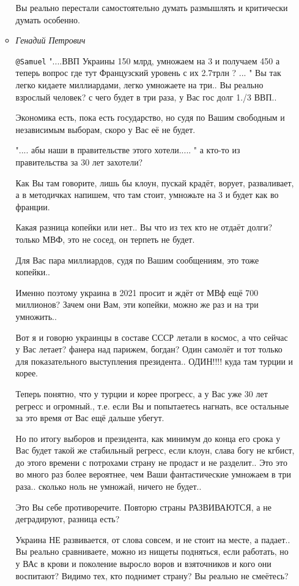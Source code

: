 \begin{itemize}
\begin{itemize}
Вы реально перестали самостоятельно думать размышлять и критически думать
особенно.

\item \emph{Генадий Петрович}

\verb|@Samuel|  "....ВВП Украины 150 млрд, умножаем на 3 и получаем 450 а теперь
вопрос где тут Французский уровень с их 2.7трлн ? ... " Вы так легко кидаете
миллиардами, легко умножаете на три..  Вы реально взрослый человек? с чего
будет в три раза, у Вас гос долг 1./3 ВВП..

Экономика есть, пока есть государство, но судя по Вашим свободным и
независимым выборам, скоро у Вас её не будет.

".... абы наши в правительстве этого хотели..... " а кто-то из правительства
за 30 лет захотели? 

Как Вы там говорите, лишь бы клоун, пускай крадёт, ворует, разваливает, а в
методичках напишем, что там стоит, умножьте на 3 и будет как во франции.

Какая разница копейки или нет.. Вы что из тех кто не отдаёт долги? только МВФ, это не сосед, он терпеть не будет.

Для Вас пара миллиардов, судя по Вашим сообщениям, это тоже копейки..

Именно поэтому украина в 2021 просит и ждёт от МВф ещё 700 миллионов? Зачем они Вам, эти копейки, можно же раз и на три умножить..

Вот я и говорю украинцы в составе СССР летали в космос, а что сейчас у Вас
летает? фанера над парижем, богдан? Один самолёт и тот только для
показательного выступления президента.. ОДИН!!!!  куда там турции и корее.

Теперь понятно, что у турции и корее прогресс, а у Вас уже 30 лет регресс и
огромный., т.е. если Вы и попытаетесь нагнать, все остальные за это время от
Вас ещё дальше убегут.

Но по итогу выборов и президента, как минимум до конца его срока у Вас будет
такой же стабильный регресс, если клоун, слава богу не кгбист, до этого
времени с потрохами страну не продаст и не разделит.. Это это во много раз
более вероятнее, чем Ваши фантастические умножаем в три раза.. сколько ноль не
умножай, ничего не будет..

Это Вы себе противоречите. Повторю страны РАЗВИВАЮТСЯ, а не деградируют, разница есть?

Украина НЕ развивается, от слова совсем, и не стоит на месте, а падает.. Вы
реально сравниваете, можно из нищеты подняться, если работать, но у ВАс в
крови и поколение выросло воров и взяточников и кого они воспитают? Видимо
тех, кто поднимет страну? Вы реально не смеётесь?


\end{itemize}
\end{itemize}
